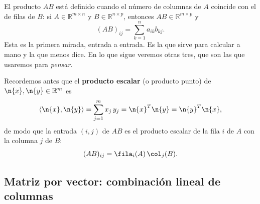 El producto $AB$ está definido cuando el número de columnas de $A$ coincide con
el de filas de $B$: si $A \in \mathbb{R}^{m \times n}$ y
$B \in \mathbb{R}^{n \times p}$, entonces $AB \in \mathbb{R}^{m \times p}$ y
\[
(AB)_{ij} = \sum_{k=1}^{n} a_{ik} b_{kj}.
\]
Esta es la primera mirada, entrada a entrada. Es la que sirve para calcular a
mano y la que menos dice. En lo que sigue veremos otras tres, que son las que
usaremos para \emph{pensar}.

Recordemos antes que el \textbf{producto escalar} (o producto punto) de
$\n{x},\n{y}\in\mathbb{R}^m$ es
\[
\langle \n{x}, \n{y} \rangle = \sum_{j=1}^{m} x_j\,y_j = \n{x}^T \n{y} = \n{y}^T \n{x},
\]
de modo que la entrada $(i,j)$ de $AB$ es el producto escalar de la fila $i$ de
$A$ con la columna $j$ de $B$:
\[
(AB)_{ij} = \fila_i(A)\, \col_j(B).
\]

\subsection{Matriz por vector: combinación lineal de columnas}


